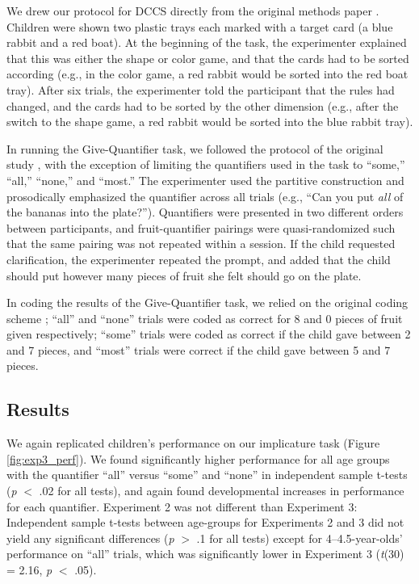 \documentclass[man]{apa2}
\begin{document}
We drew our protocol for DCCS directly from the original methods paper \cite{zelazo2006}. Children were shown two plastic trays each marked with a target card (a blue rabbit and a red boat). At the beginning of the task, the experimenter explained that this was either the shape or color game, and that the cards had to be sorted according (e.g., in the color game, a red rabbit would be sorted into the red boat tray). After six trials, the experimenter told the participant that the rules had changed, and the cards had to be sorted by the other dimension (e.g., after the switch to the shape game, a red rabbit would be sorted into the blue rabbit tray).

In running the Give-Quantifier task, we followed the protocol of the original study \cite{barner2009}, with the exception of limiting the quantifiers used in the task to ``some,'' ``all,'' ``none,'' and ``most.'' The experimenter used the partitive construction and prosodically emphasized the quantifier across all trials (e.g., ``Can you put \textit{all} of the bananas into the plate?''). Quantifiers were presented in two different orders between participants, and fruit-quantifier pairings were quasi-randomized such that the same pairing was not repeated within a session. If the child requested clarification, the experimenter repeated the prompt, and added that the child should put however many pieces of fruit she felt should go on the plate.

In coding the results of the Give-Quantifier task, we relied on the original coding scheme \cite{barner2009}; ``all'' and ``none'' trials were coded as correct for 8 and 0 pieces of fruit given respectively; ``some'' trials were coded as correct if the child gave between 2 and 7 pieces, and ``most'' trials were correct if the child gave between 5 and 7 pieces.

\subsection{Results}

We again replicated children's performance on our implicature task (Figure \ref{fig:exp3_perf}). We found significantly higher performance for all age groups with the quantifier ``all'' versus ``some'' and ``none'' in independent sample t-tests (\emph{p} $<$ .02 for all tests), and again found developmental increases in performance for each quantifier. Experiment 2 was not different than Experiment 3: Independent sample t-tests between  age-groups for Experiments 2 and 3 did not yield any significant differences (\emph{p} $>$ .1 for all tests) except for 4--4.5-year-olds' performance on ``all'' trials, which was significantly lower in Experiment 3 (\emph{t}(30) = 2.16, \emph{p} $<$ .05).
\end{document}
